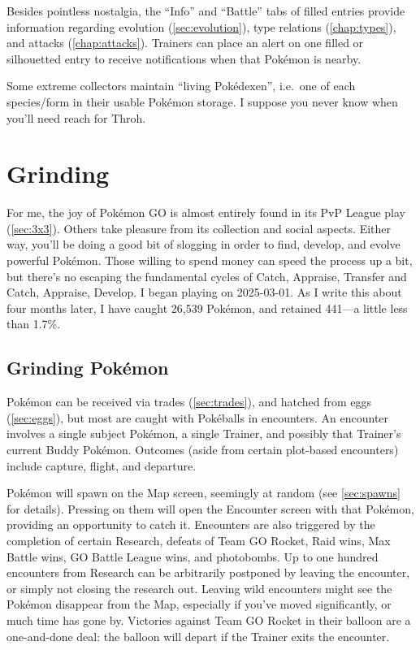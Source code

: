 Besides pointless nostalgia, the ``Info'' and ``Battle'' tabs of filled entries
  provide information regarding evolution (\autoref{sec:evolution}), type
  relations (\autoref{chap:types}), and attacks (\autoref{chap:attacks}).
Trainers can place an alert on one filled or silhouetted entry to receive
  notifications when that Pokémon is nearby.

\begin{tipbox}[title=Living Pokédexen]
Some extreme collectors maintain ``living Pokédexen'', i.e.\ one of each
  species/form in their usable Pokémon storage.
I suppose you never know when you'll need reach for Throh.
\end{tipbox}

\section{Grinding\label{sec:grinding}}
For me, the joy of Pokémon GO is almost entirely found in its PvP League play (\autoref{sec:3x3}).
Others take pleasure from its collection and social aspects.
Either way, you'll be doing a good bit of slogging in order to find, develop,
  and evolve powerful Pokémon.
Those willing to spend money can speed the process up a bit, but there's
  no escaping the fundamental cycles of Catch, Appraise, Transfer and
  Catch, Appraise, Develop. 
I began playing on 2025-03-01.
As I write this about four months later, I have caught 26,539 Pokémon, and retained 441---a little less than 1.7\%.

\subsection{Grinding Pokémon\label{subsec:getmons}}
Pokémon can be received via trades (\autoref{sec:trades}),
  and hatched from eggs (\autoref{sec:eggs}),
  but most are caught with Pokéballs in encounters.
An encounter involves a single subject Pokémon, a single Trainer,
  and possibly that Trainer's current Buddy Pokémon.
Outcomes (aside from certain plot-based encounters) include capture, flight, and departure.

Pokémon will spawn on the Map screen, seemingly at random (see \autoref{sec:spawns} for details).
Pressing on them will open the Encounter screen with that Pokémon,
  providing an opportunity to catch it.
Encounters are also triggered by the completion of certain Research,
  defeats of Team GO Rocket, Raid wins, Max Battle wins, GO Battle League wins,
  and photobombs.
Up to one hundred encounters from Research can be arbitrarily postponed by leaving the encounter,
  or simply not closing the research out.
Leaving wild encounters might see the Pokémon disappear from the Map, especially
  if you've moved significantly, or much time has gone by.
Victories against Team GO Rocket in their balloon are a one-and-done deal:
  the balloon will depart if the Trainer exits the encounter.

